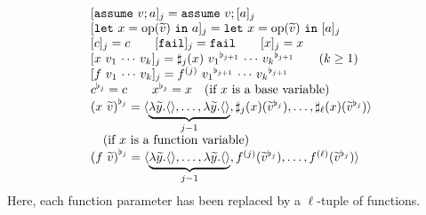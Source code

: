 \[
\begin{array}{l}
\X{\ASSUME{v}{\CALL}}{j} = \ASSUME{v}{\X{\CALL}{j}}\\
\X{\LETEQIN{x}{\OP(\seq{v})}{\CALL}}{j} = \LETEQIN{x}{\OP(\seq{v})}{\X{\CALL}{j}}\\
\X{c}{j} = c\qquad
\X{\FAIL}{j} = \FAIL\qquad
\X{x}{j} = x\\
\X{x\ v_1\,\cdots\,v_k}{j} = \NTH{j}(x)\ \Dup{v_1}{j+1}\,\cdots\,\Dup{v_k}{j+1} \qquad(k \geq 1)\\
\X{f\ v_1\,\cdots\,v_k}{j} = \Copy{f}{j}\ \Dup{v_1}{j+1}\,\cdots\,\Dup{v_k}{j+1}\\
\Dup{c}{j} = c\qquad
\Dup{x}{j} = x \quad \mbox{(if \(x\) is a base variable)}\\
\Dup{(x\ \seq{v})}{j} =
                   \tuple{\underbrace{\lambda\seq{y}.\tuple{},\ldots,\lambda\seq{y}.\tuple{}}_{j-1},\NTH{j}(x)(\Dup{\seq{v}}{j}),\ldots,\NTH{\ell}(x)(\Dup{\seq{v}}{j})}\\
 \quad \mbox{(if \(x\) is a function variable)} \\
\Dup{(f\ \seq{v})}{j} =
                   \tuple{\underbrace{\lambda\seq{y}.\tuple{},\ldots,\lambda\seq{y}.\tuple{}}_{j-1},\Copy{f}{j}(\Dup{\seq{v}}{j}),\ldots,\Copy{f}{\ell}(\Dup{\seq{v}}{j})}\\
\end{array}
\]
Here, each function parameter has been replaced by a \(\ell\)-tuple of functions.

